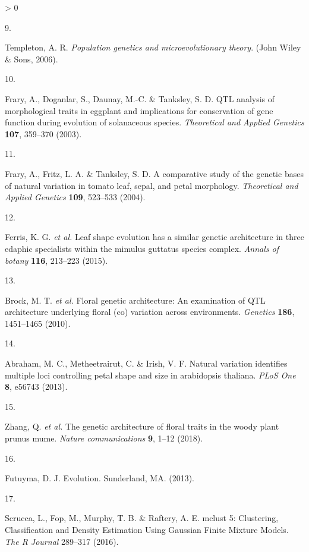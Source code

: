 \documentclass[
  11pt,
]{article}
\newlength{\cslhangindent}
\newlength{\csllabelwidth}
\newenvironment{CSLReferences}[2] %
 {%
  \setlength{\parindent}{0pt}
  \ifodd #1 \everypar{\setlength{\hangindent}{\cslhangindent}}\ignorespaces\fi
  \ifnum #2 > 0
  \setlength{\parskip}{#2\baselineskip}
  \fi
 }%
 {}
\newcommand{\CSLLeftMargin}[1]{\parbox[t]{\csllabelwidth}{#1}}
\newcommand{\CSLRightInline}[1]{\parbox[t]{\linewidth - \csllabelwidth}{#1}\break}
\begin{document}
\begin{CSLReferences}{0}{0}
\leavevmode\hypertarget{ref-templeton2006population}{}%
\CSLLeftMargin{9. }
\CSLRightInline{Templeton, A. R. \emph{Population genetics and microevolutionary theory}. (John Wiley \& Sons, 2006).}

\leavevmode\hypertarget{ref-frary2003qtl}{}%
\CSLLeftMargin{10. }
\CSLRightInline{Frary, A., Doganlar, S., Daunay, M.-C. \& Tanksley, S. D. QTL analysis of morphological traits in eggplant and implications for conservation of gene function during evolution of solanaceous species. \emph{Theoretical and Applied Genetics} \textbf{107}, 359--370 (2003).}

\leavevmode\hypertarget{ref-frary2004comparative}{}%
\CSLLeftMargin{11. }
\CSLRightInline{Frary, A., Fritz, L. A. \& Tanksley, S. D. A comparative study of the genetic bases of natural variation in tomato leaf, sepal, and petal morphology. \emph{Theoretical and Applied Genetics} \textbf{109}, 523--533 (2004).}

\leavevmode\hypertarget{ref-ferris2015leaf}{}%
\CSLLeftMargin{12. }
\CSLRightInline{Ferris, K. G. \emph{et al.} Leaf shape evolution has a similar genetic architecture in three edaphic specialists within the mimulus guttatus species complex. \emph{Annals of botany} \textbf{116}, 213--223 (2015).}

\leavevmode\hypertarget{ref-brock2010floral}{}%
\CSLLeftMargin{13. }
\CSLRightInline{Brock, M. T. \emph{et al.} Floral genetic architecture: An examination of QTL architecture underlying floral (co) variation across environments. \emph{Genetics} \textbf{186}, 1451--1465 (2010).}

\leavevmode\hypertarget{ref-abraham2013natural}{}%
\CSLLeftMargin{14. }
\CSLRightInline{Abraham, M. C., Metheetrairut, C. \& Irish, V. F. Natural variation identifies multiple loci controlling petal shape and size in arabidopsis thaliana. \emph{PLoS One} \textbf{8}, e56743 (2013).}

\leavevmode\hypertarget{ref-zhang2018genetic}{}%
\CSLLeftMargin{15. }
\CSLRightInline{Zhang, Q. \emph{et al.} The genetic architecture of floral traits in the woody plant prunus mume. \emph{Nature communications} \textbf{9}, 1--12 (2018).}

\leavevmode\hypertarget{ref-futuyma2013evolution}{}%
\CSLLeftMargin{16. }
\CSLRightInline{Futuyma, D. J. Evolution. Sunderland, MA. (2013).}

\leavevmode\hypertarget{ref-Scrucca:2016wq}{}%
\CSLLeftMargin{17. }
\CSLRightInline{Scrucca, L., Fop, M., Murphy, T. B. \& Raftery, A. E. {mclust 5: Clustering, Classification and Density Estimation Using Gaussian Finite Mixture Models}. \emph{The R Journal} 289--317 (2016).}


\end{CSLReferences}
\end{document}
